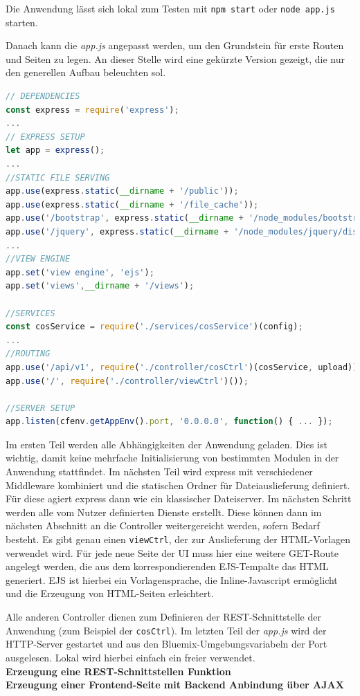 Die Anwendung lässt sich lokal zum Testen mit \lstinline|npm start| oder \lstinline|node app.js| starten.
 
Danach kann die \textit{app.js} angepasst werden, um den Grundstein für erste Routen und Seiten zu legen. An dieser Stelle wird eine gekürzte Version gezeigt, die nur den generellen Aufbau beleuchten sol.

\begin{lstlisting}[language=JavaScript, caption=Anpassung der Hauptdatei der Anwendung]
// DEPENDENCIES
const express = require('express');
... 
// EXPRESS SETUP
let app = express();
...
//STATIC FILE SERVING
app.use(express.static(__dirname + '/public'));
app.use(express.static(__dirname + '/file_cache'));
app.use('/bootstrap', express.static(__dirname + '/node_modules/bootstrap/dist'));
app.use('/jquery', express.static(__dirname + '/node_modules/jquery/dist'));
...
//VIEW ENGINE
app.set('view engine', 'ejs');
app.set('views',__dirname + '/views');

//SERVICES
const cosService = require('./services/cosService')(config);
...
//ROUTING
app.use('/api/v1', require('./controller/cosCtrl')(cosService, upload));
app.use('/', require('./controller/viewCtrl')());

//SERVER SETUP
app.listen(cfenv.getAppEnv().port, '0.0.0.0', function() { ... });
\end{lstlisting}

Im ersten Teil werden alle Abhängigkeiten der Anwendung geladen. Dies ist wichtig, damit keine mehrfache Initialisierung von bestimmten Modulen in der Anwendung stattfindet. Im nächsten Teil wird express mit verschiedener Middleware kombiniert und die statischen Ordner für Dateiauslieferung definiert. Für diese agiert express dann wie ein klassischer Dateiserver.
Im nächsten Schritt werden alle vom Nutzer definierten Dienste erstellt. Diese können dann im nächsten Abschnitt an die Controller weitergereicht werden, sofern Bedarf besteht.
Es gibt genau einen \lstinline|viewCtrl|, der zur Auslieferung der HTML-Vorlagen verwendet wird. Für jede neue Seite der \ac{UI} muss hier eine weitere GET-Route angelegt werden, die aus dem korrespondierenden EJS-Tempalte das HTML generiert.
EJS ist hierbei ein Vorlagensprache, die Inline-Javascript ermöglicht und die Erzeugung von HTML-Seiten erleichtert.

Alle anderen Controller dienen zum Definieren der REST-Schnittstelle der Anwendung (zum Beispiel der \lstinline|cosCtrl|). Im letzten Teil der \textit{app.js} wird der HTTP-Server gestartet und aus den Bluemix-Umgebungsvariabeln der Port ausgelesen. Lokal wird hierbei einfach ein freier verwendet.\\

\textbf{Erzeugung eine REST-Schnittstellen Funktion}\\
\textbf{Erzeugung einer Frontend-Seite mit Backend Anbindung über AJAX}\\